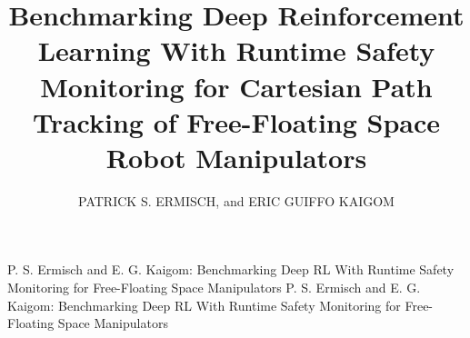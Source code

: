 \documentclass{ieeeaccess}
\begin{document}

\title{Benchmarking Deep Reinforcement Learning With Runtime Safety Monitoring for Cartesian Path Tracking of Free-Floating Space Robot Manipulators}
\author{\uppercase{Patrick S. Ermisch}, and 
\uppercase{Eric Guiffo Kaigom} }
\address[1]{Department of Computer Science \& Engineering, Frankfurt University of Applied Sciences,
Frankfurt am Main, Germany \\(e-mail: patrick.ermisch@proton.me, kaigom@fra-uas.de)}

\markboth
{P. S. Ermisch and E. G. Kaigom: Benchmarking Deep RL With Runtime Safety Monitoring for Free-Floating Space Manipulators}
{P. S. Ermisch and E. G. Kaigom: Benchmarking Deep RL With Runtime Safety Monitoring for Free-Floating Space Manipulators}

\end{document}
